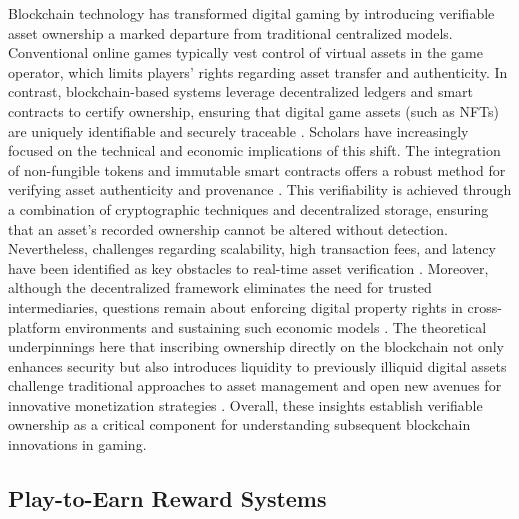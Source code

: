 Blockchain technology has transformed digital gaming by introducing verifiable
asset ownership a marked departure from traditional centralized models.
Conventional online games typically vest control of virtual assets in the game
operator, which limits players’ rights regarding asset transfer and
authenticity. In contrast, blockchain-based systems leverage decentralized
ledgers and smart contracts to certify ownership, ensuring that digital game
assets (such as NFTs) are uniquely identifiable and securely traceable
\cite{minBlockchainGamesSurvey2019}. Scholars have increasingly focused on the
technical and economic implications of this shift. The integration of
non-fungible tokens and immutable smart contracts offers a robust method for
verifying asset authenticity and provenance
\cite{gaoEmpiricalStudyAdoption2021}. This verifiability is achieved through a
combination of cryptographic techniques and decentralized storage, ensuring that
an asset’s recorded ownership cannot be altered without detection. Nevertheless,
challenges regarding scalability, high transaction fees, and latency have been
identified as key obstacles to real-time asset verification
\cite{rishiwalBlockchainSecureGamingEnvironments2024}. Moreover, although the
decentralized framework eliminates the need for trusted intermediaries,
questions remain about enforcing digital property rights in cross-platform
environments and sustaining such economic models
\cite{delfabbroUnderstandingMechanicsConsumer2022}. The theoretical
underpinnings here that inscribing ownership directly on the blockchain not only
enhances security but also introduces liquidity to previously illiquid digital
assets challenge traditional approaches to asset management and open new avenues
for innovative monetization strategies \cite{kocerEffectsBlockchainGame2022}.
Overall, these insights establish verifiable ownership as a critical component
for understanding subsequent blockchain innovations in gaming.

\subsection{Play-to-Earn Reward Systems}

